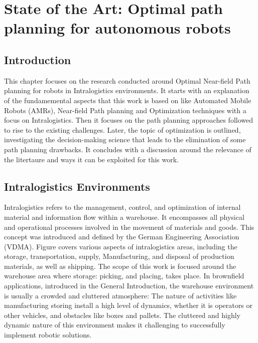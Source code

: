 \chapter{State of the Art: Optimal path planning for autonomous robots}

\renewcommand{\chaptername}{Chapter}

\section*{Introduction}
This chapter focuses on the research conducted around Optimal Near-field Path planning
for robots in Intralogistics environments. 
It starts with an explanation of the fundamemental aspects that this work is based on 
like Automated Mobile Robots (AMRs), Near-field Path planning and Optimization techniques 
with a focus on Intralogistics.
Then it focuses on the path planning approaches followed to rise to the existing challenges.
Later, the topic of optimization is outlined, investigating the decision-making science
that leads to the elimination of some path planning drawbacks.
It concludes with a discussion around the relevance of the litertaure and ways it can be exploited
for this work. 

\section{Intralogistics Environments}
Intralogistics refers to the management, control, and optimization of internal material and 
information flow within a warehouse. It encompasses all physical and operational processes 
involved in the movement of materials and goods. This concept was introduced and defined by 
the German Engineering Association (VDMA). Figure  covers various aspects of 
intralogistics areas, including 
the storage, transportation, supply, Manufacturing, and disposal of production materials, as well as 
shipping. 
The scope of this work is focused around the warehouse 
area where storage: picking, and placing, takes place. 
In brownfield applications, introduced in the General Introduction, the warehouse environment is 
usually a crowded and cluttered 
atmosphere: The nature of activities like manufacturing storing install a high level of 
dynamics, whether it is operators or other vehicles, and obstacles like boxes and pallets. 
The cluttered 
and highly dynamic nature of this environment makes it challenging to successfully 
implement robotic solutions.

